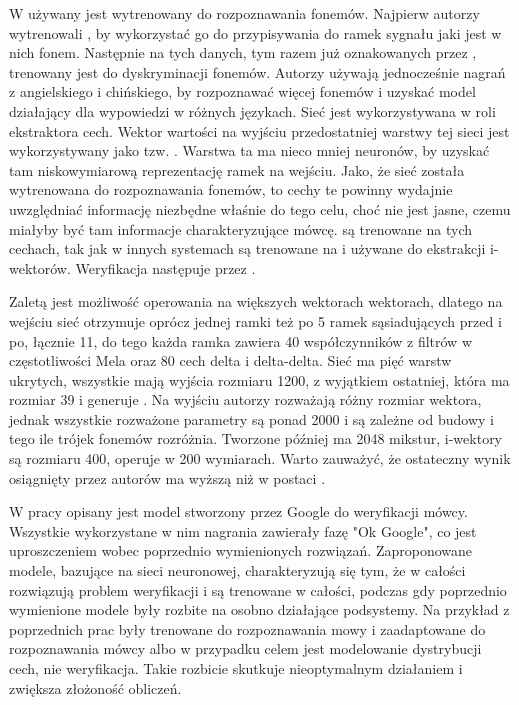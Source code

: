 W \cite{investigationOfBottleneck}
używany jest  wytrenowany do rozpoznawania fonemów. Najpierw autorzy wytrenowali , by wykorzystać go do przypisywania do ramek sygnału jaki
jest w nich fonem. Następnie na tych danych, tym razem już oznakowanych przez , trenowany jest  do dyskryminacji fonemów. Autorzy używają
jednocześnie nagrań z angielskiego i chińskiego, by rozpoznawać więcej fonemów i uzyskać model działający dla wypowiedzi w różnych językach.
Sieć jest wykorzystywana w roli ekstraktora cech. Wektor wartości na wyjściu przedostatniej warstwy tej sieci jest wykorzystywany jako tzw. .
Warstwa ta ma nieco mniej neuronów, by uzyskać tam niskowymiarową reprezentację ramek na wejściu. Jako, że sieć została wytrenowana do rozpoznawania fonemów, to cechy te powinny
wydajnie uwzględniać informację niezbędne właśnie do tego celu, choć nie jest jasne, czemu miałyby być tam informacje charakteryzujące mówcę.
 są trenowane na tych cechach, tak jak w innych systemach są trenowane na  i używane do ekstrakcji i-wektorów. Weryfikacja następuje przez .

Zaletą  jest możliwość operowania na większych wektorach wektorach, dlatego na wejściu sieć otrzymuje oprócz jednej ramki też po 5 ramek sąsiadujących przed i po, łącznie 11,
do tego każda ramka zawiera 40 współczynników z filtrów w częstotliwości Mela oraz 80 cech delta i delta-delta. Sieć ma pięć warstw ukrytych, wszystkie mają wyjścia rozmiaru 1200, z wyjątkiem
ostatniej, która ma rozmiar 39 i generuje . Na wyjściu autorzy rozważają różny rozmiar wektora, jednak wszystkie rozważone parametry są ponad 2000 i są zależne
od budowy  i tego ile trójek fonemów rozróżnia. Tworzone później  ma 2048 mikstur, i-wektory są rozmiaru 400,  operuje w 200 wymiarach.
Warto zauważyć, że ostateczny wynik osiągnięty przez autorów ma wyższą  niż  w postaci .

W pracy \cite{endToEnd}
opisany jest model stworzony przez Google do weryfikacji mówcy. Wszystkie wykorzystane w nim nagrania zawierały fazę "Ok Google", co jest uproszczeniem wobec poprzednio wymienionych rozwiązań.
Zaproponowane modele, bazujące na sieci neuronowej, charakteryzują się tym, że w całości rozwiązują problem weryfikacji
i są trenowane w całości, podczas gdy poprzednio wymienione modele były rozbite na osobno działające podsystemy.
Na przykład  z poprzednich prac były trenowane do rozpoznawania mowy i zaadaptowane do rozpoznawania mówcy albo w przypadku  celem jest modelowanie dystrybucji cech, nie weryfikacja. Takie rozbicie skutkuje nieoptymalnym działaniem i zwiększa złożoność obliczeń.

